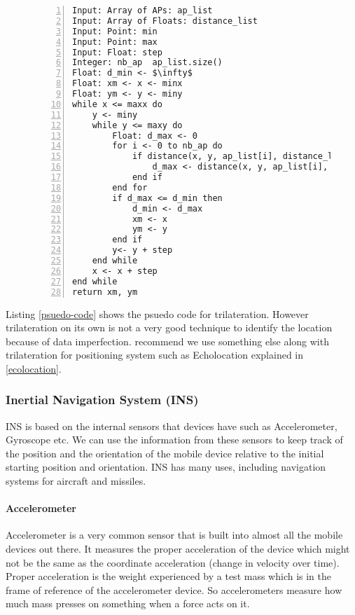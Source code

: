 \begin{figure}[H]
\begin{lstlisting}[caption = {Algorithm for Trilateration\cite{sig-cart}},frame=single,mathescape, captionpos=b,numbers=left,numbersep=5pt,label={psuedo-code}]
Input: Array of APs: ap_list
Input: Array of Floats: distance_list
Input: Point: min
Input: Point: max
Input: Float: step
Integer: nb_ap  ap_list.size()
Float: d_min <- $\infty$
Float: xm <- x <- minx
Float: ym <- y <- miny
while x <= maxx do
    y <- miny
    while y <= maxy do
        Float: d_max <- 0
        for i <- 0 to nb_ap do
            if distance(x, y, ap_list[i], distance_list[i]) > d_max then
                d_max <- distance(x, y, ap_list[i], distance_list[i])
            end if
        end for
        if d_max <= d_min then
            d_min <- d_max
            xm <- x
            ym <- y
        end if
        y<- y + step
    end while
    x <- x + step
end while
return xm, ym
\end{lstlisting}\label{trilateration_psuedocode}
\end{figure}

Listing \ref{psuedo-code} shows the psuedo code for trilateration. However trilateration on its own is not a very good technique to identify the location because of data imperfection. \citeauthor{trilat-fusion} recommend we use something else along with trilateration for positioning system\cite{trilat-fusion}  such as Echolocation explained in \ref{ecolocation}.
\subsubsection{Inertial Navigation System (INS)}

INS\cite{innertial_nav_sys} is based on the internal sensors that devices have
such as Accelerometer, Gyroscope etc. We can use the information from
these sensors to keep track of the position and the orientation of
the mobile device relative to the initial starting position and orientation. INS has many uses, including navigation systems for
aircraft and missiles\cite{ins-wiki}.


\paragraph{Accelerometer} \label{accelerometer}

Accelerometer\cite{accl-guide} is a very common sensor that is built into almost
all the mobile devices out there. It measures the proper acceleration
of the device which might not be the same as the coordinate acceleration
(change in velocity over time). Proper acceleration is the weight
experienced by a test mass which is in the frame of reference
of the accelerometer device. So accelerometers measure how much mass
presses on something when a force acts on it.


